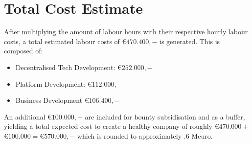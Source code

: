 \section{Total Cost Estimate}\label{subsec:total_cost_estimate}
After multiplying the amount of labour hours with their respective hourly labour costs, a total estimated labour costs of \euro$470.400,-$ is generated. This is composed of:
\begin{itemize}
	\item Decentralised Tech Development: \euro$252.000,-$
	\item Platform Development: \euro$112.000,-$
	\item Business Development \euro$106.400,-$
\end{itemize}
An additional \euro$100.000,-$ are included for bounty subsidisation and as a buffer, yielding a total expected cost to create a healthy company of roughly \euro$470.000+$\euro$100.000=$\euro$570.000,-$ which is rounded to approximately .6 Meuro.
